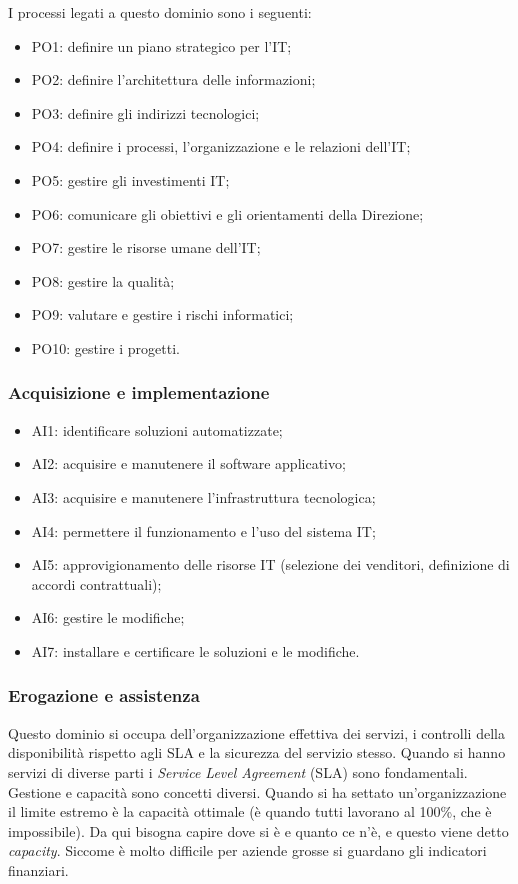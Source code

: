 I processi legati a questo dominio sono i seguenti:

\begin{itemize}
\item PO1: definire un piano strategico per l'IT;
\item PO2: definire l'architettura delle informazioni;
\item PO3: definire gli indirizzi tecnologici;
\item PO4: definire i processi, l'organizzazione e le relazioni dell'IT;
\item PO5: gestire gli investimenti IT;
\item PO6: comunicare gli obiettivi e gli orientamenti della Direzione;
\item PO7: gestire le risorse umane dell'IT;
\item PO8: gestire la qualità;
\item PO9: valutare e gestire i rischi informatici;
\item PO10: gestire i progetti.

\end{itemize}

\subsubsection{Acquisizione e implementazione}

\begin{itemize}
\item AI1: identificare soluzioni automatizzate;
\item AI2: acquisire e manutenere il software applicativo;
\item AI3: acquisire e manutenere l'infrastruttura tecnologica;
\item AI4: permettere il funzionamento e l'uso del sistema IT;
\item AI5: approvigionamento delle risorse IT (selezione dei venditori,
definizione di accordi contrattuali);
\item AI6: gestire le modifiche;
\item AI7: installare e certificare le soluzioni e le modifiche.
\end{itemize}

\subsubsection{Erogazione e assistenza}

Questo dominio si occupa dell'organizzazione effettiva dei servizi,
i controlli della disponibilità rispetto agli SLA e la sicurezza del
servizio stesso.
Quando si hanno servizi di diverse parti i \textit{Service Level 
Agreement} (SLA) sono fondamentali. Gestione e capacità sono concetti diversi.
Quando si ha settato un'organizzazione il limite estremo è la capacità 
ottimale (è quando tutti lavorano al 100\%, che è impossibile). Da qui bisogna 
capire dove si è e quanto ce n'è, e questo viene detto \textit{capacity}. 
Siccome è molto difficile per aziende grosse si guardano gli indicatori 
finanziari.
